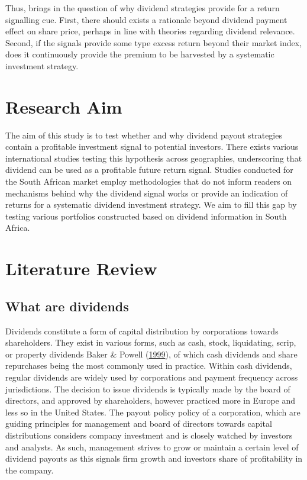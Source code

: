 \documentclass[12pt,preprint, authoryear]{elsarticle}
\numberwithin{equation}{section}
\numberwithin{figure}{section}
\numberwithin{table}{section}
\begin{document}
Thus, brings in the question of why dividend strategies provide for a
return signalling cue. First, there should exists a rationale beyond
dividend payment effect on share price, perhaps in line with theories
regarding dividend relevance. Second, if the signals provide some type
excess return beyond their market index, does it continuously provide
the premium to be harvested by a systematic investment strategy.

\hypertarget{research-aim}{%
\section{Research Aim}\label{research-aim}}

The aim of this study is to test whether and why dividend payout
strategies contain a profitable investment signal to potential
investors. There exists various international studies testing this
hypothesis across geographies, underscoring that dividend can be used as
a profitable future return signal. Studies conducted for the South
African market employ methodologies that do not inform readers on
mechanisms behind why the dividend signal works or provide an indication
of returns for a systematic dividend investment strategy. We aim to fill
this gap by testing various portfolios constructed based on dividend
information in South Africa.

\newpage

\hypertarget{literature-review}{%
\section{Literature Review}\label{literature-review}}

\hypertarget{what-are-dividends}{%
\subsection{What are dividends}\label{what-are-dividends}}

Dividends constitute a form of capital distribution by corporations
towards shareholders. They exist in various forms, such as cash, stock,
liquidating, scrip, or property dividends Baker \& Powell
(\protect\hyperlink{ref-baker1999corporate}{1999}), of which cash
dividends and share repurchases being the most commonly used in
practice. Within cash dividends, regular dividends are widely used by
corporations and payment frequency across jurisdictions. The decision to
issue dividends is typically made by the board of directors, and
approved by shareholders, however practiced more in Europe and less so
in the United States. The payout policy policy of a corporation, which
are guiding principles for management and board of directors towards
capital distributions considers company investment and is closely
watched by investors and analysts. As such, management strives to grow
or maintain a certain level of dividend payouts as this signals firm
growth and investors share of profitability in the company.
\end{document}

